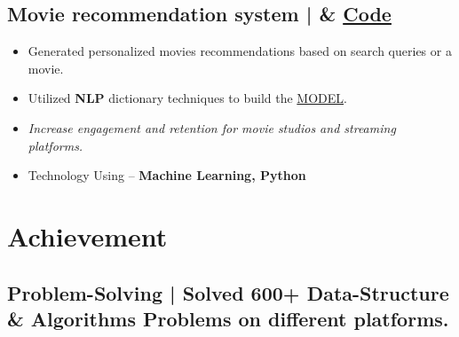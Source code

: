 \documentclass[a4,11pt]{article}
\newenvironment{zitemize}{
\begin{itemize}\itemsep0pt \parskip0pt \parsep1pt}
{\end{itemize}\vspace{-0.5cm}}
\begin{document}
\subsection{\large Movie recommendation system | \faGithub & \normalfont \href{https://github.com/akhilsharmaa/Movie-Recommender-System}{Code}
\hfill{}}
    \begin{zitemize}
        \item Generated personalized movies recommendations based on search queries or a movie. 
        \item Utilized \textbf{NLP} dictionary techniques to build the \href{https://github.com/akhilsharmaa/Movie-Recommender-System/blob/main/movie-recommendation.ipynb}{MODEL}.
        \item \textit{Increase engagement and retention for movie studios and streaming platforms.}
        \item Technology Using – \textbf{ Machine Learning, Python}
    \end{zitemize}
    

\section{Achievement}
\vspace{0.1cm}



\subsection{\large{Problem-Solving} \normalfont | Solved 600+ Data-Structure \& Algorithms Problems on different platforms.}
\end{document}
